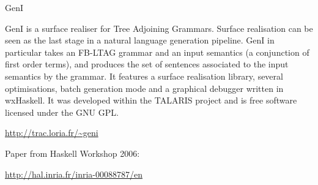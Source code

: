 \begin{hcarentry}{GenI}
\label{geni}
\makeheader

GenI is a surface realiser for Tree Adjoining Grammars. Surface
realisation can be seen as the last stage in a natural language
generation pipeline. GenI in particular takes an FB-LTAG grammar and an
input semantics (a conjunction of first order terms), and produces the
set of sentences associated to the input semantics by the grammar.  It
features a surface realisation library, several optimisations, batch
generation mode and a graphical debugger written in wxHaskell.  It was
developed within the TALARIS project and is free software licensed under
the GNU GPL.

\FurtherReading
\begin{compactitem}
\item \url{http://trac.loria.fr/~geni}
\item Paper from Haskell Workshop 2006:

\url{http://hal.inria.fr/inria-00088787/en}
\end{compactitem}
\end{hcarentry}
